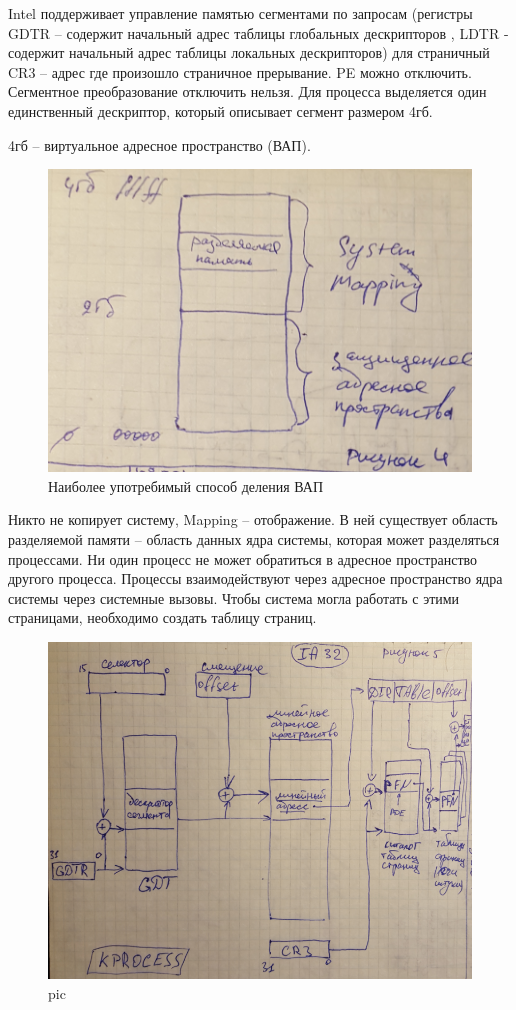Intel  поддерживает управление памятью сегментами по запросам (регистры GDTR – содержит начальный адрес таблицы глобальных дескрипторов ,  LDTR - содержит начальный адрес таблицы локальных дескрипторов) для страничный  CR3 – адрес где произошло страничное прерывание. PE можно отключить. Сегментное преобразование отключить нельзя. 
Для процесса выделяется один единственный дескриптор, который описывает сегмент размером 4гб. 

4гб – виртуальное адресное пространство (ВАП).

\begin{figure}[H]
    \centering
    \includegraphics[width=\textwidth]{pic/4.png}
    \caption{Наиболее употребимый способ деления ВАП}
\end{figure}

Никто не копирует систему, Mapping – отображение. В ней существует область разделяемой памяти – область данных ядра системы, которая может разделяться процессами. Ни один процесс не может обратиться в адресное пространство другого процесса. Процессы взаимодействуют через адресное пространство ядра системы через системные вызовы.
Чтобы система могла работать с этими страницами, необходимо создать таблицу страниц.

\begin{figure}[H]
    \centering
    \includegraphics[width=\textwidth]{pic/5.png}
    \caption{pic}
\end{figure}

